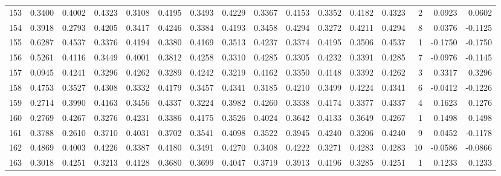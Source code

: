 \begin{tabular}{lrrrrrrrrrrrrrrr}
153 &      0.3400 &  0.4002 &  0.4323 &  0.3108 &  0.4195 &  0.3493 &  0.4229 &  0.3367 &  0.4153 &  0.3352 &   0.4182 &     0.4323 &      2 &                    0.0923 &                     0.0602 \\
154 &      0.3918 &  0.2793 &  0.4205 &  0.3417 &  0.4246 &  0.3384 &  0.4193 &  0.3458 &  0.4294 &  0.3272 &   0.4211 &     0.4294 &      8 &                    0.0376 &                    -0.1125 \\
155 &      0.6287 &  0.4537 &  0.3376 &  0.4194 &  0.3380 &  0.4169 &  0.3513 &  0.4237 &  0.3374 &  0.4195 &   0.3506 &     0.4537 &      1 &                   -0.1750 &                    -0.1750 \\
156 &      0.5261 &  0.4116 &  0.3449 &  0.4001 &  0.3812 &  0.4258 &  0.3310 &  0.4285 &  0.3305 &  0.4232 &   0.3391 &     0.4285 &      7 &                   -0.0976 &                    -0.1145 \\
157 &      0.0945 &  0.4241 &  0.3296 &  0.4262 &  0.3289 &  0.4242 &  0.3219 &  0.4162 &  0.3350 &  0.4148 &   0.3392 &     0.4262 &      3 &                    0.3317 &                     0.3296 \\
158 &      0.4753 &  0.3527 &  0.4308 &  0.3332 &  0.4179 &  0.3457 &  0.4341 &  0.3185 &  0.4210 &  0.3499 &   0.4224 &     0.4341 &      6 &                   -0.0412 &                    -0.1226 \\
159 &      0.2714 &  0.3990 &  0.4163 &  0.3456 &  0.4337 &  0.3224 &  0.3982 &  0.4260 &  0.3338 &  0.4174 &   0.3377 &     0.4337 &      4 &                    0.1623 &                     0.1276 \\
160 &      0.2769 &  0.4267 &  0.3276 &  0.4231 &  0.3386 &  0.4175 &  0.3526 &  0.4024 &  0.3642 &  0.4133 &   0.3649 &     0.4267 &      1 &                    0.1498 &                     0.1498 \\
161 &      0.3788 &  0.2610 &  0.3710 &  0.4031 &  0.3702 &  0.3541 &  0.4098 &  0.3522 &  0.3945 &  0.4240 &   0.3206 &     0.4240 &      9 &                    0.0452 &                    -0.1178 \\
162 &      0.4869 &  0.4003 &  0.4226 &  0.3387 &  0.4180 &  0.3491 &  0.4270 &  0.3408 &  0.4222 &  0.3271 &   0.4283 &     0.4283 &     10 &                   -0.0586 &                    -0.0866 \\
163 &      0.3018 &  0.4251 &  0.3213 &  0.4128 &  0.3680 &  0.3699 &  0.4047 &  0.3719 &  0.3913 &  0.4196 &   0.3285 &     0.4251 &      1 &                    0.1233 &                     0.1233 \\

\end{tabular}
